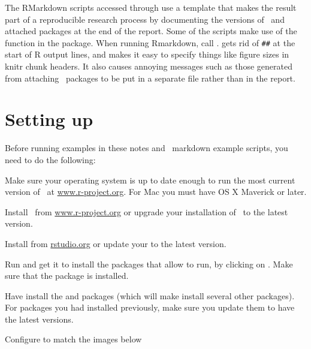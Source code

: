 The RMarkdown scripts accessed through  use a template that makes the
result part of 
a reproducible research process by documenting the versions of \R\ and
attached packages at the end of the report.  Some of the scripts make use of the
 function in the  package. When running
Rmarkdown, call .   gets
rid of \verb|##| at 
the start of R output lines, and makes it easy to specify things like
figure sizes in knitr chunk headers. It also causes annoying messages
such as those generated from attaching \R\ packages to be put in a
separate file  rather than in the report.

\section{Setting up \R}
Before running examples in these notes and \R\ markdown example
scripts, you need to do the following:
\be
\item Make sure your operating system is up to date enough to run the
  most current version of \R\ at \href{https://www.r-project.org/}{www.r-project.org}.  For Mac you
  must have OS X Maverick or later.
\item Install \R\ from \href{https://www.r-project.org/}{www.r-project.org} or upgrade your
  installation of \R\ to the latest version.
\item Install  from \href{https://www.rstudio.com/}{rstudio.org} or update your
   to the latest version.
\item Run  and get it to install the packages that allow
   to run, by clicking on .  Make sure that the  package is installed.
\item Have  install the  and  packages
  (which will make  install several other packages).  For
  packages you had installed previously, make sure you update them to
  have the latest versions.
\item Configure   to match
  the images below
  
